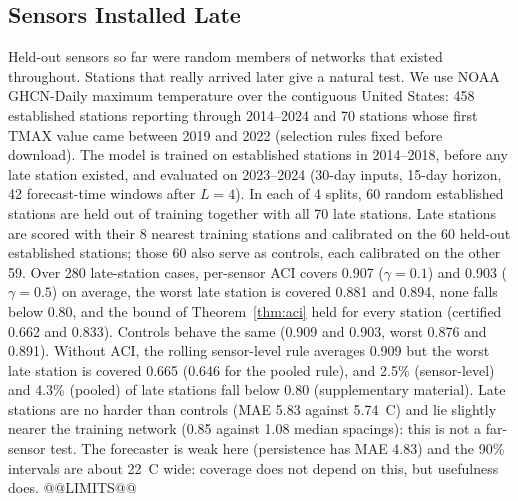 \subsection{Sensors Installed Late}
\label{sec:late}
Held-out sensors so far were random members of networks that existed throughout. Stations that really arrived later
give a natural test. We use NOAA GHCN-Daily maximum temperature over the contiguous United States: 458 established
stations reporting through 2014--2024 and 70 stations whose first TMAX value came between 2019 and 2022 (selection
rules fixed before download). The model is trained on established stations in 2014--2018, before any late station
existed, and evaluated on 2023--2024 (30-day inputs, 15-day horizon, 42 forecast-time windows after $L=4$). In each of 4
splits, 60 random established stations are held out of training together with all 70 late stations. Late stations are
scored with their 8 nearest training stations and calibrated on the 60 held-out established stations; those 60 also
 serve as controls, each calibrated on the other 59.
Over 280 late-station cases, per-sensor ACI covers 0.907 ($\gamma=0.1$) and
0.903 ($\gamma=0.5$) on average, the worst late station is covered 0.881 and 0.894, none falls below 0.80, and the
bound of Theorem~\ref{thm:aci} held for every station (certified 0.662 and 0.833). Controls behave the same (0.909 and
0.903, worst 0.876 and 0.891). Without ACI, the rolling sensor-level rule averages 0.909 but the worst late station is
covered 0.665 (0.646 for the pooled rule), and 2.5\% (sensor-level) and 4.3\% (pooled) of late stations fall below 0.80
(supplementary material). Late stations are no harder than controls (MAE 5.83 against 5.74~\textdegree C) and lie slightly nearer the training network (0.85 against 1.08 median spacings): this is not a far-sensor test.  The
forecaster is weak here (persistence has MAE 4.83) and the 90\% intervals are about 22~\textdegree C wide: coverage
does not depend on this, but usefulness does.
@@LIMITS@@
